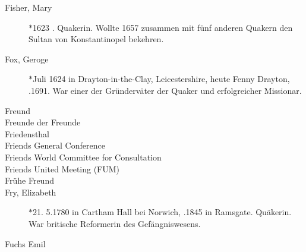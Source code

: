 \begin{description}
 \item[Fisher, Mary] $\ast$1623 . Quakerin. Wollte 1657 zusammen mit fünf anderen Quakern den Sultan von Konstantinopel bekehren.

 \item[Fox, Geroge] $\ast$Juli 1624 in Drayton-in-the-Clay, Leicestershire, heute Fenny Drayton, .1691. War einer der Gründerväter der Quaker und erfolgreicher Missionar.

 \item[Freund]
 \item[Freunde der Freunde]

 \item[Friedensthal]

 \item[Friends General Conference]

 \item[Friends World Committee for Consultation]

 \item[Friends United Meeting (FUM)]

 \item[Frühe Freund]

 \item[Fry, Elizabeth] $\ast$21. 5.1780 in Cartham Hall bei Norwich, .1845 in Ramsgate. Quäkerin. War britische Reformerin des Gefängniswesens.

 \item[Fuchs Emil]


 \end{description}

\normalsize
